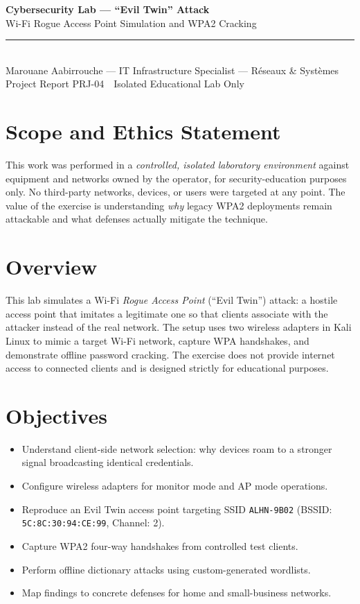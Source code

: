 \documentclass[11pt,a4paper]{article}
\begin{document}
\begin{center}
  {\LARGE\bfseries Cybersecurity Lab --- ``Evil Twin'' Attack}\\[4pt]
  {\large Wi-Fi Rogue Access Point Simulation and WPA2 Cracking}\\[8pt]
  {\color{noc}\rule{\textwidth}{1pt}}\\[6pt]
  {\small Marouane Aabirrouche --- IT Infrastructure Specialist --- R\'eseaux \& Syst\`emes}\\
  {\small Project Report PRJ-04 \,\textbullet\, Isolated Educational Lab Only}
\end{center}

\vspace{0.5cm}

\section*{Scope and Ethics Statement}
This work was performed in a \emph{controlled, isolated laboratory environment}
against equipment and networks owned by the operator, for security-education
purposes only. No third-party networks, devices, or users were targeted at any
point. The value of the exercise is understanding \emph{why} legacy WPA2
deployments remain attackable and what defenses actually mitigate the technique.

\section{Overview}
This lab simulates a Wi-Fi \emph{Rogue Access Point} (``Evil Twin'') attack: a
hostile access point that imitates a legitimate one so that clients associate
with the attacker instead of the real network. The setup uses two wireless adapters
in Kali Linux to mimic a target Wi-Fi network, capture WPA handshakes, and
demonstrate offline password cracking. The exercise does not provide internet
access to connected clients and is designed strictly for educational purposes.

\section{Objectives}
\begin{itemize}[leftmargin=1.6em]
  \item Understand client-side network selection: why devices roam to a
        stronger signal broadcasting identical credentials.
  \item Configure wireless adapters for monitor mode and AP mode operations.
  \item Reproduce an Evil Twin access point targeting SSID \texttt{ALHN-9B02} 
        (BSSID: \texttt{5C:8C:30:94:CE:99}, Channel: 2).
  \item Capture WPA2 four-way handshakes from controlled test clients.
  \item Perform offline dictionary attacks using custom-generated wordlists.
  \item Map findings to concrete defenses for home and small-business networks.
\end{itemize}
\end{document}
